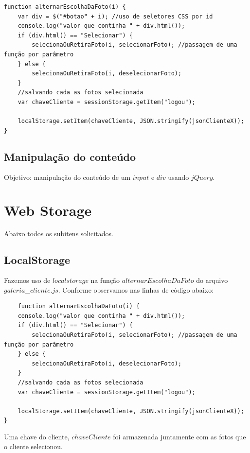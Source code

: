 \begin{lstlisting}
function alternarEscolhaDaFoto(i) {
    var div = $("#botao" + i); //uso de seletores CSS por id
    console.log("valor que continha " + div.html());
    if (div.html() == "Selecionar") {
        selecionaOuRetiraFoto(i, selecionarFoto); //passagem de uma função por parâmetro
    } else {
        selecionaOuRetiraFoto(i, deselecionarFoto);
    }
    //salvando cada as fotos selecionada
    var chaveCliente = sessionStorage.getItem("logou");

    localStorage.setItem(chaveCliente, JSON.stringify(jsonClienteX));
}
\end{lstlisting}

\subsection{Manipulação do conteúdo}
	Objetivo: manipulação do conteúdo de um $input$ e $div$ usando $jQuery$.

\section{Web Storage } 
	Abaixo todos os subitens solicitados.
\subsection{LocalStorage}
	Fazemos uso de $localstorage$ na função $alternarEscolhaDaFoto$ do arquivo $galeria$\_$cliente.js$. Conforme observamos nas linhas de código abaixo:
	
\begin{lstlisting}
	function alternarEscolhaDaFoto(i) {
    console.log("valor que continha " + div.html());
    if (div.html() == "Selecionar") {
        selecionaOuRetiraFoto(i, selecionarFoto); //passagem de uma função por parâmetro
    } else {
        selecionaOuRetiraFoto(i, deselecionarFoto);
    }
    //salvando cada as fotos selecionada
    var chaveCliente = sessionStorage.getItem("logou");

    localStorage.setItem(chaveCliente, JSON.stringify(jsonClienteX));
}
	\end{lstlisting}
	Uma chave do cliente, $chaveCliente$ foi armazenada juntamente com as fotos que o cliente selecionou.
	
